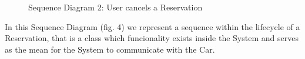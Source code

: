 \documentclass[a4paper]{article}
\begin{document}
\begin{figure}[h]
\centering
\vspace*{\fill}
\noindent{}%
\caption {Sequence Diagram 2: User cancels a Reservation}
\vspace*{0.5cm}
\end{figure}
In this Sequence Diagram (fig. 4) we represent a sequence within the lifecycle of a Reservation, that is a class which funcionality exists inside the System and serves as the mean for the System to communicate with the Car.
\newpage
\end{document}
